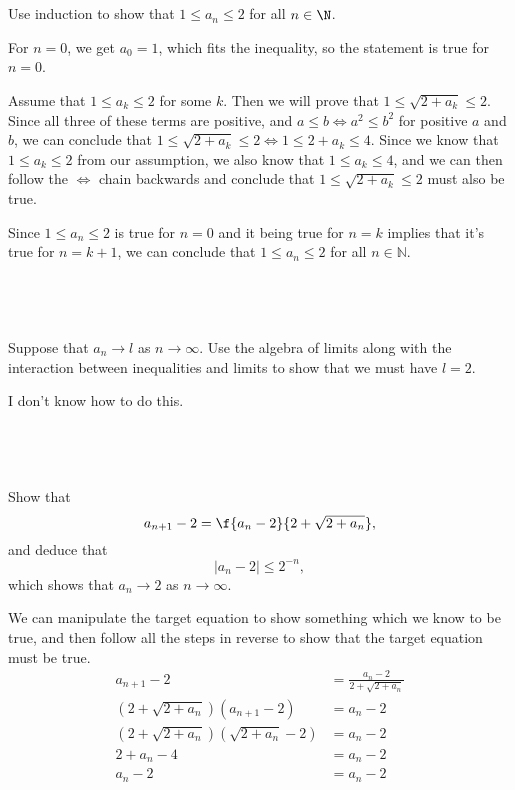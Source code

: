 \documentclass[a4paper]{article}
\begin{document}
\subsection{~} %

\begin{questionbody}
Use induction to show that $1 \le a_n \le 2$ for all $n \in \N$. 
\end{questionbody}

For $n=0$, we get $a_0 = 1$, which fits the inequality, so the statement is true for $n=0$.

Assume that $1 \le a_k \le 2$ for some $k$. Then we will prove that $1 \le \sqrt{2 + a_k} \le 2$. Since all three of these terms are positive, and $a \le b \iff a^2 \le b^2$ for positive $a$ and $b$, we can conclude that $1 \le \sqrt{2 + a_k} \le 2 \iff 1 \le 2 + a_k \le 4$. Since we know that $1 \le a_k \le 2$ from our assumption, we also know that $1 \le a_k \le 4$, and we can then follow the $\iff$ chain backwards and conclude that $1 \le \sqrt{2 + a_k} \le 2$ must also be true.

Since $1 \le a_n \le 2$ is true for $n=0$ and it being true for $n=k$ implies that it's true for $n=k+1$, we can conclude that $1 \le a_n \le 2$ for all $n \in \mathbb N$.

\subsection{~} %

\begin{questionbody}
Suppose that $a_n \to l$ as $n \to \infty$. Use the algebra of limits along with the interaction between inequalities and limits to show that we must have $l = 2$.
\end{questionbody}

I don't know how to do this.

\newpage
\subsection{~} %

\begin{questionbody}
Show that \[
a_{n+1} - 2 = \f{a_n - 2}{2 + \sqrt{2 + a_n}},
\] and deduce that \[
|a_n - 2| \le 2^{-n},
\] which shows that $a_n \to 2$ as $n \to \infty$.
\end{questionbody}

We can manipulate the target equation to show something which we know to be true, and then follow all the steps in reverse to show that the target equation must be true.
\begin{align*}
	a_{n+1} - 2 &= \frac{a_n - 2}{2 + \sqrt{2 + a_n}}\\
	\left( 2 + \sqrt{2 + a_n} \right) (a_{n+1} - 2) &= a_n - 2\\
	\left( 2 + \sqrt{2 + a_n} \right) \left( \sqrt{2 + a_n} - 2 \right) &= a_n - 2\\
	2 + a_n - 4 &= a_n - 2\\
	a_n - 2 &= a_n - 2
\end{align*}
\end{document}
